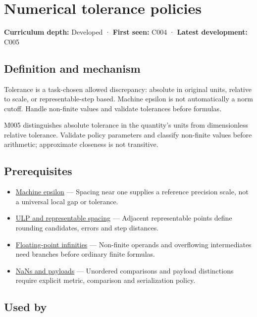 \hypertarget{appendix-0ec599f8ba27}{}
\section{Numerical tolerance policies}\label{appendix-0ec599f8ba27-numerical-tolerance-policies}

\textbf{Curriculum depth:} Developed · \textbf{First seen:} C004 · \textbf{Latest development:} C005

\subsection{Definition and mechanism}\label{appendix-0ec599f8ba27-definition-and-mechanism}

Tolerance is a task-chosen allowed discrepancy: absolute in original units, relative to scale, or representable-step based. Machine epsilon is not automatically a norm cutoff. Handle non-finite values and validate tolerances before formulas.

M005 distinguishes absolute tolerance in the quantity's units from dimensionless relative tolerance. Validate policy parameters and classify non-finite values before arithmetic; approximate closeness is not transitive.

\subsection{Prerequisites}\label{appendix-0ec599f8ba27-prerequisites}

\begin{itemize}
\tightlist
\item
  \hyperref[appendix-390ea641da54]{Machine epsilon} --- Spacing near one supplies a reference precision scale, not a universal local gap or tolerance.
\item
  \hyperref[appendix-14bab4cab9d4]{ULP and representable spacing} --- Adjacent representable points define rounding candidates, errors and step distances.
\item
  \hyperref[appendix-eb336149c00a]{Floating-point infinities} --- Non-finite operands and overflowing intermediates need branches before ordinary finite formulas.
\item
  \hyperref[appendix-d6607cc4c235]{NaNs and payloads} --- Unordered comparisons and payload distinctions require explicit metric, comparison and serialization policy.
\end{itemize}

\subsection{Used by}\label{appendix-0ec599f8ba27-used-by}

